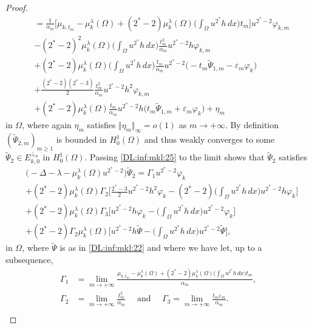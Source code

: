 \documentclass[10pt]{amsart}
\numberwithin{equation}{section}
\newcommand{\ve}{\varepsilon}
\newcommand{\vp}{\varphi}
\newcommand{\Om}{\Omega}
\newcommand{\mkl}{\mu_{k}^{\lambda}}
\theoremstyle{plain}
\theoremstyle{remark}
\begin{document}
\begin{proof}
\begin{equation}
\begin{aligned}
& = \frac{1}{\alpha_m} \Bigg[ \mu_{k,t_m} - \mkl(\Om) + (2^*-2) \mkl(\Om) \Big( \int_{\Om} u^{2^*}h \, dx\Big) t_m \Bigg] u^{2^*-2} \vp_{k,m} \\
& - (2^*-2)^2  \mkl(\Om)\Big( \int_{\Om} u^{2^*}h \, dx\Big) \frac{t_m^2}{\alpha_m} u^{2^*-2} h \vp_{k,m} \\
& + (2^*-2) \mkl(\Om) \Big( \int_{\Om} u^{2^*}h \, dx\Big) \frac{t_m}{\alpha_m} u^{2^*-2} \big(- t_m \tilde{\Psi}_{1,m} - \ve_m \vp_k \big) \\
& + \frac{(2^*-2)(2^*-3)}{2}  \frac{t_m^2}{\alpha_m}u^{2^*-2} h^2 \vp_{k,m} \\
& + (2^*-2) \mkl(\Om)\frac{t_m}{\alpha_m} u^{2^*-2}h  \big(t_m \tilde{\Psi}_{1,m} + \ve_m \vp_k \big)   + \eta_m
\end{aligned} 
\end{equation}
in $\Om$, where again $\eta_m$ satisfies $\Vert \eta_m \Vert_\infty = o(1)$ as $m \to + \infty$. By definition $(\tilde{\Psi}_{2,m})_{m \ge1}$ is bounded in $H^1_0(\Om)$ and thus weakly converges to some $\tilde{\Psi}_2 \in E_{k,0}^{\perp_u}$ in $H^1_0(\Om)$. Passing \eqref{DL:inf:mkl:25} to the limit shows that $\tilde{\Psi}_2$ satisfies 
\begin{equation} \label{DL:inf:mkl:26}
\begin{aligned}
& \big( - \Delta  - \lambda - \mkl(\Om) u^{2^*-2} \big)\tilde{\Psi}_{2} = \Gamma_1 u^{2^*-2} \vp_k \\
& + (2^*-2) \mkl(\Om)  \Gamma_2\Bigg[ \frac{2^*-3}{2}  u^{2^*-2} h^2 \vp_k - (2^*-2) \Big( \int_{\Om} u^{2^*}h \, dx\Big) u^{2^*-2} h \vp_k  \Bigg] \\
& + (2^*-2) \mkl(\Om) \Gamma_3\Bigg[  u^{2^*-2} h \vp_k - \Big( \int_{\Om} u^{2^*}h \, dx\Big)u^{2^*-2} \vp_k \Bigg] \\
& + (2^*-2) \Gamma_2 \mkl(\Om) \Bigg[ u^{2^*-2} h \tilde{\Psi} - \Big( \int_{\Om} u^{2^*}h \, dx\Big)u^{2^*-2} \tilde{\Psi} \Bigg],
\end{aligned} 
\end{equation}
in $\Om$, where $\tilde{\Psi}$ is as in \eqref{DL:inf:mkl:22} and where we have let, up to a subsequence,
$$\begin{aligned}
\Gamma_1 & = \lim_{m \to + \infty} \frac{ \mu_{k,t_m} - \mkl(\Om) + (2^*-2) \mkl(\Om) \Big( \int_{\Om} u^{2^*}h \, dx\Big) t_m }{\alpha_m}, \\
\Gamma_2 & = \lim_{m \to + \infty} \frac{t_m^2}{\alpha_m} \quad \text{ and } \quad \Gamma_3  = \lim_{m \to + \infty} \frac{t_m \ve_m }{\alpha_m}. \\

\end{aligned}$$
\end{proof}
\end{document}

